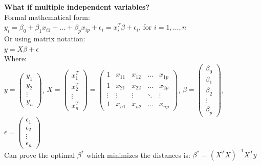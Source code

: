 \documentclass{article}%
\begin{document}
\textbf{What if multiple independent variables?} \\
Formal mathematical form: \\
$y_i = \beta_0 + \beta_1x_{i1} + \dots + \beta_px_{ip} + \epsilon_i = x_i^T\beta + \epsilon_i$, for $i = 1, \dots, n$ \\
Or using matrix notation: \\
$y = X\beta + \epsilon$ \\
Where: \\
$y = \begin{pmatrix} y_1 \\ y_2 \\ \vdots \\ y_n \end{pmatrix}$, $X = \begin{pmatrix} x_1^T \\ x_2^T \\ \vdots \\ x_n^T \end{pmatrix} = \begin{pmatrix} 1 & x_{11} & x_{12} & \dots & x_{1p} \\ 1 & x_{21} & x_{22} & \dots & x_{2p} \\ \vdots & \vdots & \vdots & \ddots & \vdots \\ 1 & x_{n1} & x_{n2} & \dots & x_{np} \end{pmatrix}$, $\beta = \begin{pmatrix} \beta_0 \\ \beta_1 \\ \beta_2 \\ \vdots \\ \beta_p \end{pmatrix}$, $\epsilon = \begin{pmatrix} \epsilon_1 \\ \epsilon_2 \\ \vdots \\ \epsilon_n \end{pmatrix}$ \\
Can prove the optimal $\beta^*$ which minimizes the distances is: $\beta^* = (X^TX)^{-1}X^Ty$
%
\end{document}
